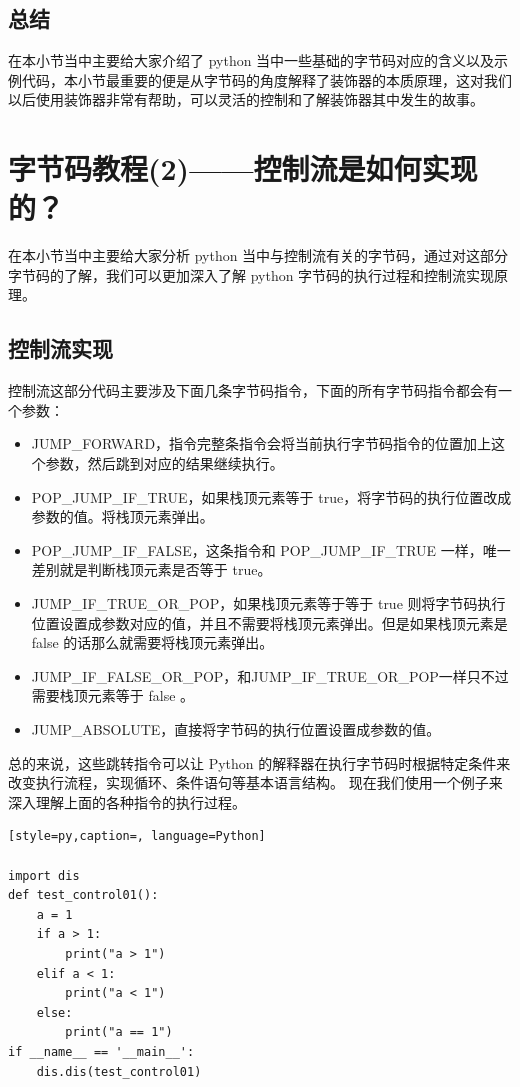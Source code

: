 \subsection{总结}
在本小节当中主要给大家介绍了 python 当中一些基础的字节码对应的含义以及示例代码，本小节最重要的便是从字节码的角度解释了装饰器的本质原理，这对我们以后使用装饰器非常有帮助，可以灵活的控制和了解装饰器其中发生的故事。


\section{字节码教程(2)——控制流是如何实现的？}
在本小节当中主要给大家分析 python 当中与控制流有关的字节码，通过对这部分字节码的了解，我们可以更加深入了解 python 字节码的执行过程和控制流实现原理。
\subsection{控制流实现}
控制流这部分代码主要涉及下面几条字节码指令，下面的所有字节码指令都会有一个参数：
\begin{itemize}
\item JUMP\_FORWARD，指令完整条指令会将当前执行字节码指令的位置加上这个参数，然后跳到对应的结果继续执行。 
\item POP\_JUMP\_IF\_TRUE，如果栈顶元素等于 true，将字节码的执行位置改成参数的值。将栈顶元素弹出。 
\item POP\_JUMP\_IF\_FALSE，这条指令和 POP\_JUMP\_IF\_TRUE 一样，唯一差别就是判断栈顶元素是否等于 true。  
\item JUMP\_IF\_TRUE\_OR\_POP，如果栈顶元素等于等于 true 则将字节码执行位置设置成参数对应的值，并且不需要将栈顶元素弹出。但是如果栈顶元素是 false 的话那么就需要将栈顶元素弹出。 
\item JUMP\_IF\_FALSE\_OR\_POP，和JUMP\_IF\_TRUE\_OR\_POP一样只不过需要栈顶元素等于 false 。 
\item JUMP\_ABSOLUTE，直接将字节码的执行位置设置成参数的值。 
\end{itemize}
总的来说，这些跳转指令可以让 Python 的解释器在执行字节码时根据特定条件来改变执行流程，实现循环、条件语句等基本语言结构。
现在我们使用一个例子来深入理解上面的各种指令的执行过程。
\begin{lstlisting}[style=py,caption=, language=Python]

import dis
def test_control01():
    a = 1
    if a > 1:
        print("a > 1")
    elif a < 1:
        print("a < 1")
    else:
        print("a == 1")
if __name__ == '__main__':
    dis.dis(test_control01)
\end{lstlisting}

